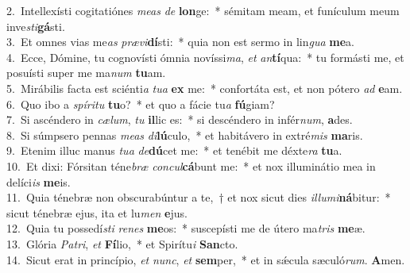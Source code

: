{2.~}Intellexísti cogitatiónes \textit{me}\textit{as} \textit{de} \textbf{lon}ge:~* sémitam meam, et funículum meum inve\textit{sti}\textbf{gá}sti.\\
{3.~}Et omnes vias me\textit{as} \textit{præ}\textit{vi}\textbf{dí}sti:~* quia non est sermo in lin\textit{gua} \textbf{me}a.\\
{4.~}Ecce, Dómine, tu cognovísti ómnia novíssi\textit{ma}, \textit{et} \textit{an}\textbf{tí}qua:~* tu formásti me, et posuísti super me ma\textit{num} \textbf{tu}am.\\
{5.~}Mirábilis facta est sciénti\textit{a} \textit{tu}\textit{a} \textbf{ex} me:~* confortáta est, et non pótero \textit{ad} \textbf{e}am.\\
{6.~}Quo ibo a \textit{spí}\textit{ri}\textit{tu} \textbf{tu}o?~* et quo a fácie tu\textit{a} \textbf{fú}giam?\\
{7.~}Si ascéndero in \textit{cæ}\textit{lum}, \textit{tu} \textbf{il}lic es:~* si descéndero in infér\textit{num}, \textbf{a}des.\\
{8.~}Si súmpsero pennas \textit{me}\textit{as} \textit{di}\textbf{lú}culo,~* et habitávero in extré\textit{mis} \textbf{ma}ris.\\
{9.~}Etenim illuc manus \textit{tu}\textit{a} \textit{de}\textbf{dú}cet me:~* et tenébit me déxte\textit{ra} \textbf{tu}a.\\
{10.~}Et dixi: Fórsitan téne\textit{bræ} \textit{con}\textit{cul}\textbf{cá}bunt me:~* et nox illuminátio mea in delíci\textit{is} \textbf{me}is.\\
{11.~}Quia ténebræ non obscurabúntur a te,~† et nox sicut dies \textit{il}\textit{lu}\textit{mi}\textbf{ná}bitur:~* sicut ténebræ ejus, ita et lu\textit{men} \textbf{e}jus.\\
{12.~}Quia tu possedí\textit{sti} \textit{re}\textit{nes} \textbf{me}os:~* suscepísti me de útero ma\textit{tris} \textbf{me}æ.\\
{13.~}Glória \textit{Pa}\textit{tri}, \textit{et} \textbf{Fí}lio,~* et Spirítu\textit{i} \textbf{San}cto.\\
{14.~}Sicut erat in princípio, \textit{et} \textit{nunc}, \textit{et} \textbf{sem}per,~* et in sǽcula sæculó\textit{rum}. \textbf{A}men.\\
